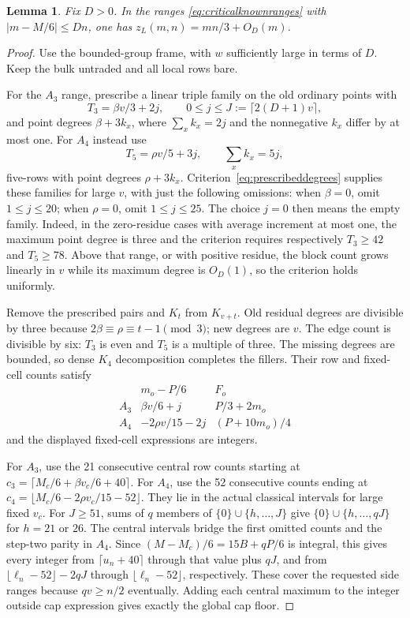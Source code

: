 \documentclass[11pt]{article}
\newtheorem{lemma}[theorem]{Lemma}
\newcommand{\zl}{z_L}
\begin{document}
\begin{lemma}\label{lem:criticalknown}
Fix $D>0$. In the ranges \eqref{eq:criticalknownranges} with
$|m-M/6|\le Dn$, one has $\zl(m,n)=mn/3+O_D(m)$.
\end{lemma}
\begin{proof}
Use the bounded-group frame, with $w$ sufficiently large in terms of $D$.
Keep the bulk untraded and all local rows bare.

For the $A_3$ range, prescribe a linear triple family on the old ordinary
points with
\[
 T_3=\beta v/3+2j,\qquad 0\le j\le J:=\lceil2(D+1)v\rceil,
\]
and point degrees $\beta+3k_x$, where $\sum_x k_x=2j$ and the
nonnegative $k_x$ differ by at most one. For $A_4$ instead use
\[
 T_5=\rho v/5+3j,\qquad \sum_x k_x=5j,
\]
five-rows with point degrees $\rho+3k_x$.
Criterion~\eqref{eq:prescribeddegrees} supplies these families for large
$v$, with just the following omissions: when $\beta=0$, omit
$1\le j\le20$; when $\rho=0$, omit $1\le j\le25$.
The choice $j=0$ then means the empty family.
Indeed, in the zero-residue cases with average increment at most one,
the maximum point degree is three and the criterion requires respectively
$T_3\ge42$ and $T_5\ge78$. Above that range, or with positive residue,
the block count grows linearly in $v$ while its maximum degree is
$O_D(1)$, so the criterion holds uniformly.

Remove the prescribed pairs and $K_t$ from $K_{v+t}$.
Old residual degrees are divisible by three because
$2\beta\equiv\rho\equiv t-1\pmod3$; new degrees are $v$.
The edge count is divisible by six: $T_3$ is even and $T_5$ is a multiple
of three. The missing degrees are bounded, so dense $K_4$ decomposition
completes the fillers. Their row and fixed-cell counts satisfy
\[
\begin{array}{c|c|c}
 &m_o-P/6&F_o\\ \hline
 A_3&\beta v/6+j&P/3+2m_o\\
 A_4&-2\rho v/15-2j&(P+10m_o)/4
\end{array}
\]
and the displayed fixed-cell expressions are integers.

For $A_3$, use the 21 consecutive central row counts starting at
$c_3=\lceil M_c/6+\beta v_c/6+40\rceil$.
For $A_4$, use the 52 consecutive counts ending at
$c_4=\lfloor M_c/6-2\rho v_c/15-52\rfloor$.
They lie in the actual classical intervals for large fixed $v_c$.
For $J\ge51$, sums of $q$ members of
$\{0\}\cup\{h,\ldots,J\}$ give
$\{0\}\cup\{h,\ldots,qJ\}$ for $h=21$ or $26$.
The central intervals bridge the first omitted counts and the step-two
parity in $A_4$. Since $(M-M_c)/6=15B+qP/6$ is integral, this gives
every integer from $\lceil u_n+40\rceil$ through that value plus $qJ$,
and from $\lfloor\ell_n-52\rfloor-2qJ$ through
$\lfloor\ell_n-52\rfloor$, respectively.
These cover the requested side ranges because $qv\ge n/2$ eventually.
Adding each central maximum to the integer outside cap expression gives
exactly the global cap floor.


\end{proof}
\end{document}
